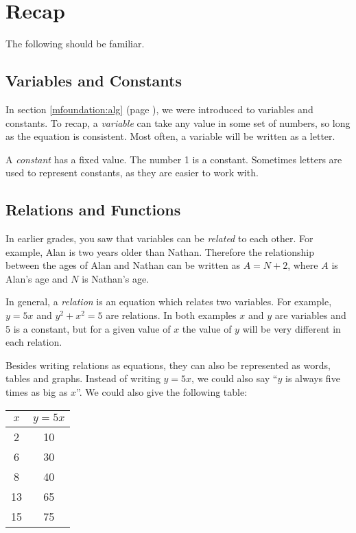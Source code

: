\documentclass[10pt,a4paper,titlepage,twoside,openright]{report}
\begin{document}
\section{Recap}
The following should be familiar.

\subsection{Variables and Constants}
In section \ref{mfoundation:alg} (page \pageref{mfoundation:alg}), we were introduced to variables and constants. To recap, a \textit{variable} can take any value in some set of numbers, so long as the equation is consistent. Most often, a variable will be written as a letter.

A \textit{constant} has a fixed value. The number 1 is a constant. Sometimes letters are used to represent constants, as they are easier to work with.


\subsection{Relations and Functions}
In earlier grades, you saw that variables can be \textit{related} to each other. For example, Alan is two years older than Nathan. Therefore the relationship between the ages of Alan and Nathan can be written as $A=N+2$, where $A$ is Alan's age and $N$ is Nathan's age.

In general, a \textit{relation} is an equation which relates two variables. For example, $y=5x$ and $y^2+x^2=5$ are relations. In both examples $x$ and $y$ are variables and 5 is a constant, but for a given value of $x$ the value of $y$ will be very different in each relation.

Besides writing relations as equations, they can also be represented as words, tables and graphs. Instead of writing $y = 5x$, we could also say ``$y$ is always five times as big as $x$''. We could also give the following table:

\begin{center}
\begin{tabular}{|c|c|}\hline
$x$ & $y = 5x$ \\\hline\hline
2 & 10 \\\hline
6 & 30 \\\hline
8 & 40 \\\hline
13 & 65 \\\hline
15 & 75 \\\hline
\end{tabular}
\end{center}
\end{document}
